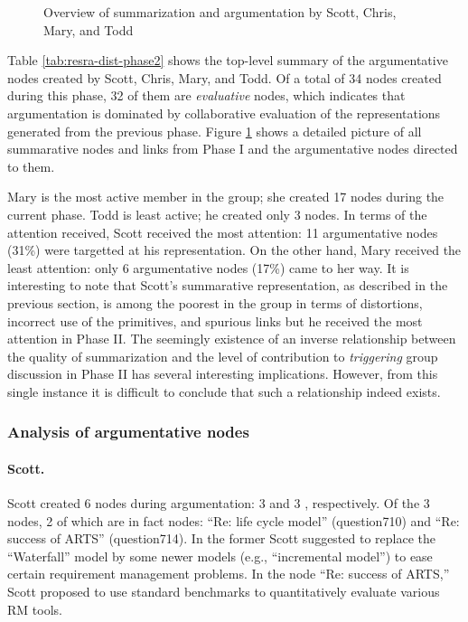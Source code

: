 \begin{figure}[hbtp]
 \caption{Overview of summarization and argumentation by Scott, Chris,
 Mary, and Todd} 
  \label{fig:case-phase-2}
\end{figure}

Table \ref{tab:resra-dist-phase2} shows the top-level summary of the
argumentative nodes created by Scott, Chris, Mary, and Todd. Of a total of
34 nodes created during this phase, 32 of them are {\it evaluative\/}
nodes, which indicates that argumentation is dominated by collaborative
evaluation of the representations generated from the previous phase. Figure
\ref{fig:case-phase-2} shows a detailed picture of all summarative nodes
and links from Phase I and the argumentative nodes directed to them.

Mary is the most active member in the group; she created 17 nodes during
the current phase. Todd is least active; he created only 3 nodes. In terms
of the attention received, Scott received the most attention: 11
argumentative nodes (31\%) were targetted at his representation. On the
other hand, Mary received the least attention: only 6 argumentative nodes
(17\%) came to her way. It is interesting to note that Scott's summarative
representation, as described in the previous section, is among the poorest
in the group in terms of distortions, incorrect use of the primitives, and
spurious links but he received the most attention in Phase II. The
seemingly existence of an inverse relationship between the quality of
summarization and the level of contribution to {\it triggering\/} group
discussion in Phase II has several interesting implications. However,
from this single instance it is difficult to conclude that such a
relationship indeed exists.

\subsubsection{Analysis of argumentative nodes}

\paragraph{Scott.}

Scott created 6 nodes during argumentation: 3  and 3
, respectively. Of the 3 
nodes, 2 of which are in fact  nodes: ``Re: life cycle
model'' (question710) and ``Re: success of ARTS'' (question714). In the
former Scott suggested to replace the ``Waterfall'' model by some newer
models (e.g., ``incremental model'') to ease certain requirement management
problems. In the node ``Re: success of ARTS,'' Scott proposed to use
standard benchmarks to quantitatively evaluate various RM tools.


